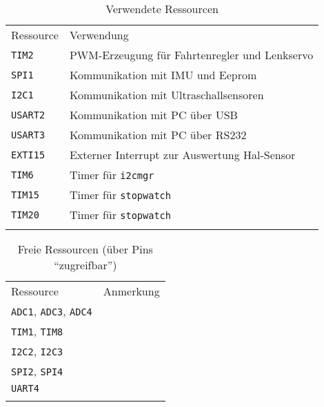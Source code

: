 \begin{table}[htb]%
	\centering
	\caption{Verwendete Ressourcen}
	\label{tab:used_uc_ressources}
	\begin{tabular}{ll}
		\mytoprule
		Ressource & Verwendung \\
		\mymidrule
		\verb|TIM2|   & PWM-Erzeugung für Fahrtenregler und Lenkservo \\
		\verb|SPI1|   & Kommunikation mit IMU und Eeprom \\
		\verb|I2C1|   & Kommunikation mit Ultraschallsensoren \\
		\verb|USART2| & Kommunikation mit PC über USB \\
		\verb|USART3| & Kommunikation mit PC über RS232 \\
		\verb|EXTI15| & Externer Interrupt zur Auswertung Hal-Sensor \\
		\verb|TIM6|   & Timer für \verb|i2cmgr| \\
		\verb|TIM15|  & Timer für \verb|stopwatch| \\
		\verb|TIM20|  & Timer für \verb|stopwatch| \\
		\mybottomrule
	\end{tabular}
\end{table}


\begin{table}[htb]%
	\centering
	\caption{Freie Ressourcen (über Pins "`zugreifbar"')}
	\label{tab:free_uc_ressources}
	\begin{tabular}{ll}
		\mytoprule
		Ressource & Anmerkung \\
		\mymidrule
		\verb|ADC1|, \verb|ADC3|, \verb|ADC4| & \\
		\verb|TIM1|, \verb|TIM8| &  \\
		\verb|I2C2|, \verb|I2C3| &  \\
		\verb|SPI2|, \verb|SPI4| & \\
		\verb|UART4| & \\
		\mybottomrule
	\end{tabular}
\end{table}


